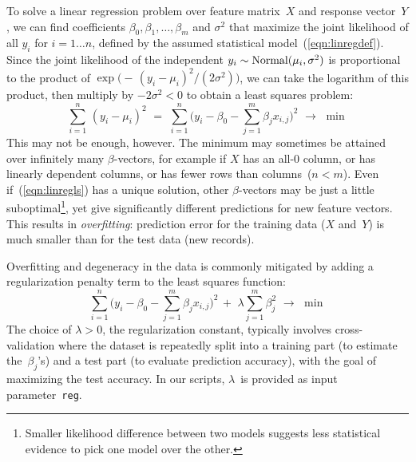 \smallskip

To solve a linear regression problem over feature matrix~$X$ and response vector~$Y$,
we can find coefficients $\beta_0, \beta_1, \ldots, \beta_m$ and $\sigma^2$ that maximize
the joint likelihood of all $y_i$ for $i=1\ldots n$, defined by the assumed statistical
model~(\ref{eqn:linregdef}).  Since the joint likelihood of the independent
$y_i \sim \mathop{\mathrm{Normal}}\nolimits(\mu_i, \sigma^2)$ is proportional to the product of
$\exp\big({-}\,(y_i - \mu_i)^2 / (2\sigma^2)\big)$, we can take the logarithm of this
product, then multiply by $-2\sigma^2 < 0$ to obtain a least squares problem:
\begin{equation}
\sum_{i=1}^n \, (y_i - \mu_i)^2 \,\,=\,\, 
\sum_{i=1}^n \Big(y_i - \beta_0 - \sum_{j=1}^m \beta_j x_{i,j}\Big)^2
\,\,\to\,\,\min
\label{eqn:linregls}
\end{equation}
This may not be enough, however.  The minimum may sometimes be attained over infinitely many
$\beta$-vectors, for example if $X$ has an all-0 column, or has linearly dependent columns,
or has fewer rows than columns~\mbox{($n < m$)}.  Even if~(\ref{eqn:linregls}) has a unique
solution, other $\beta$-vectors may be just a little suboptimal\footnote{Smaller likelihood
difference between two models suggests less statistical evidence to pick one model over the
other.}, yet give significantly different predictions for new feature vectors.  This results
in \emph{overfitting}: prediction error for the training data ($X$ and~$Y$) is much smaller
than for the test data (new records).

Overfitting and degeneracy in the data is commonly mitigated by adding a regularization penalty
term to the least squares function:
\begin{equation}
\sum_{i=1}^n \Big(y_i - \beta_0 - \sum_{j=1}^m \beta_j x_{i,j}\Big)^2
\,+\,\, \lambda \sum_{j=1}^m \beta_j^2
\,\,\to\,\,\min
\label{eqn:linreglsreg}
\end{equation}
The choice of $\lambda>0$, the regularization constant, typically involves cross-validation
where the dataset is repeatedly split into a training part (to estimate the~$\beta_j$'s) and
a test part (to evaluate prediction accuracy), with the goal of maximizing the test accuracy.
In our scripts, $\lambda$~is provided as input parameter~{\tt reg}.

